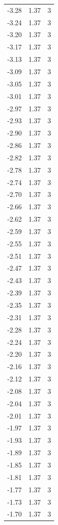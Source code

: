 \begin{longtable}{lrr}
  -3.28 & 1.37 & 3 \\
  -3.24 & 1.37 & 3 \\
  -3.20 & 1.37 & 3 \\
  -3.17 & 1.37 & 3 \\
  -3.13 & 1.37 & 3 \\
  -3.09 & 1.37 & 3 \\
  -3.05 & 1.37 & 3 \\
  -3.01 & 1.37 & 3 \\
  -2.97 & 1.37 & 3 \\
  -2.93 & 1.37 & 3 \\
  -2.90 & 1.37 & 3 \\
  -2.86 & 1.37 & 3 \\
  -2.82 & 1.37 & 3 \\
  -2.78 & 1.37 & 3 \\
  -2.74 & 1.37 & 3 \\
  -2.70 & 1.37 & 3 \\
  -2.66 & 1.37 & 3 \\
  -2.62 & 1.37 & 3 \\
  -2.59 & 1.37 & 3 \\
  -2.55 & 1.37 & 3 \\
  -2.51 & 1.37 & 3 \\
  -2.47 & 1.37 & 3 \\
  -2.43 & 1.37 & 3 \\
  -2.39 & 1.37 & 3 \\
  -2.35 & 1.37 & 3 \\
  -2.31 & 1.37 & 3 \\
  -2.28 & 1.37 & 3 \\
  -2.24 & 1.37 & 3 \\
  -2.20 & 1.37 & 3 \\
  -2.16 & 1.37 & 3 \\
  -2.12 & 1.37 & 3 \\
  -2.08 & 1.37 & 3 \\
  -2.04 & 1.37 & 3 \\
  -2.01 & 1.37 & 3 \\
  -1.97 & 1.37 & 3 \\
  -1.93 & 1.37 & 3 \\
  -1.89 & 1.37 & 3 \\
  -1.85 & 1.37 & 3 \\
  -1.81 & 1.37 & 3 \\
  -1.77 & 1.37 & 3 \\
  -1.73 & 1.37 & 3 \\
  -1.70 & 1.37 & 3 \\

\end{longtable}
